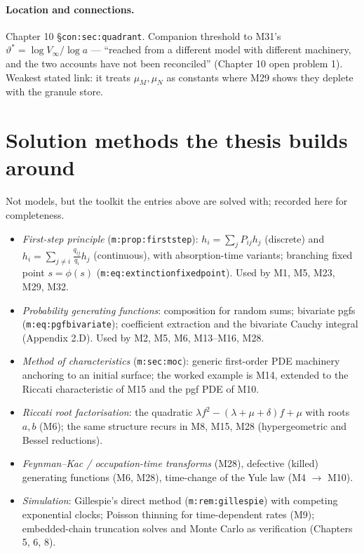 \documentclass[11pt,a4paper]{article}
\begin{document}
\paragraph{Location and connections.} Chapter 10
\S\texttt{con:sec:quadrant}. Companion threshold to M31's
$\vartheta^*=\log V_\infty/\log a$ --- ``reached from a different model
with different machinery, and the two accounts have not been reconciled''
(Chapter 10 open problem 1). Weakest stated link: it treats $\mu_M,\mu_N$
as constants where M29 shows they deplete with the granule store.

\section{Solution methods the thesis builds around}

Not models, but the toolkit the entries above are solved with; recorded
here for completeness.

\begin{itemize}
\item \emph{First-step principle} (\texttt{m:prop:firststep}):
  $h_i=\sum_jP_{ij}h_j$ (discrete) and $h_i=\sum_{j\ne i}\frac{q_{ij}}
  {q_i}h_j$ (continuous), with absorption-time variants; branching fixed
  point $s=\phi(s)$ (\texttt{m:eq:extinctionfixedpoint}). Used by M1, M5,
  M23, M29, M32.
\item \emph{Probability generating functions}: composition for random sums;
  bivariate pgfs (\texttt{m:eq:pgfbivariate}); coefficient extraction and
  the bivariate Cauchy integral (Appendix 2.D). Used by M2, M5, M6,
  M13--M16, M28.
\item \emph{Method of characteristics} (\texttt{m:sec:moc}): generic
  first-order PDE machinery anchoring to an initial surface; the worked
  example is M14, extended to the Riccati characteristic of M15 and the
  pgf PDE of M10.
\item \emph{Riccati root factorisation}: the quadratic
  $\lambda f^2-(\lambda+\mu+\delta)f+\mu$ with roots $a,b$ (M6); the same
  structure recurs in M8, M15, M28 (hypergeometric and Bessel reductions).
\item \emph{Feynman--Kac / occupation-time transforms} (M28), defective
  (killed) generating functions (M6, M28), time-change of the Yule law
  (M4 $\to$ M10).
\item \emph{Simulation}: Gillespie's direct method
  (\texttt{m:rem:gillespie}) with competing exponential clocks; Poisson
  thinning for time-dependent rates (M9); embedded-chain truncation solves
  and Monte Carlo as verification (Chapters 5, 6, 8).
\end{itemize}
\end{document}
